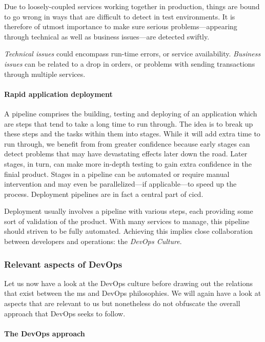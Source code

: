 Due to loosely-coupled services working together in production, things
are bound to go wrong in ways that are difficult to detect in test
environments. It is therefore of utmost importance to make sure
serious problems---appearing through technical as well as business
issues---are detected swiftly.

\textit{Technical issues} could encompass run-time errors, or service
availability. \textit{Business issues} can be related to a drop in orders, or
problems with sending transactions through multiple services.
\cite{ms-prereq}

\paragraph{Rapid application deployment}

A pipeline comprises the building, testing and deploying of an
application which are steps that tend to take a long time to run
through. The idea is to break up these steps and the tasks within them
into stages. While it will add extra time to run through, we benefit
from from greater confidence because early stages can detect problems
that may have devastating effects later down the road. Later stages,
in turn, can make more in-depth testing to gain extra confidence in
the finial product. Stages in a pipeline can be automated or require
manual intervention and may even be parallelized---if applicable---to
speed up the process. Deployment pipelines are in fact a central part
of \gls{cicd}. \cite{pipelines}

Deployment usually involves a pipeline with various steps, each
providing some sort of validation of the product.  With many services
to manage, this pipeline should striven to be fully automated.
Achieving this implies close collaboration between
developers and operations: the \textit{DevOps Culture}. \cite{ms-prereq} 

\subsubsection{Relevant aspects of DevOps}

Let us now have a look at the DevOps culture before drawing out the
relations that exist between the \gls{ms} and DevOps philosophies. We
will again have a look at aspects that are relevant to us but
nonetheless do not obfuscate the overall approach that DevOps
seeks to follow.

\paragraph{The DevOps approach}

